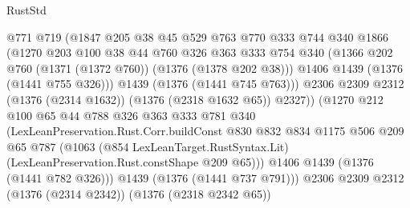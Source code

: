 \begin{lexlean}{RustStd}
\begin{coremodule}
                            @771
                            @719
                            (@1847
                              @205
                              @38
                              @45
                              @529
                              @763
                              @770
                              @333
                              @744
                              @340
                              @1866
                              (@1270
                                @203
                                @100
                                @38
                                @44
                                @760
                                @326
                                @363
                                @333
                                @754
                                @340
                                (@1366 @202 @760 (@1371 (@1372 @760)) (@1376 (@1378 @202 @38)))
                                @1406
                                @1439
                                (@1376 (@1441 @755 @326)))
                              @1439
                              (@1376 (@1441 @745 @763)))
                            @2306
                            @2309
                            @2312
                            (@1376 (@2314 @1632))
                            (@1376 (@2318 @1632 @65))
                            @2327))
                        (@1270
                          @212
                          @100
                          @65
                          @44
                          @788
                          @326
                          @363
                          @333
                          @781
                          @340
                          (LexLeanPreservation.Rust.Corr.buildConst
                            @830
                            @832
                            @834
                            @1175
                            @506
                            @209
                            @65
                            @787
                            (@1063
                              (@854 LexLeanTarget.RustSyntax.Lit)
                              (LexLeanPreservation.Rust.constShape @209 @65)))
                          @1406
                          @1439
                          (@1376 (@1441 @782 @326)))
                        @1439
                        (@1376 (@1441 @737 @791)))
                      @2306
                      @2309
                      @2312
                      (@1376 (@2314 @2342))
                      (@1376 (@2318 @2342 @65))

\end{coremodule}
\end{lexlean}
